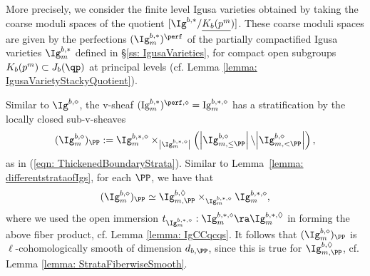 \documentclass[letterpaper,11pt]{amsart}
\begin{document}
More precisely, we consider the finite level Igusa varieties obtained by taking the coarse moduli spaces of the quotient $[\Ig^{b,\ast}/\underline{K_b(p^m})]$. These coarse moduli spaces are given by the perfections $(\Ig^{b,\ast}_{m})^{\perf}$ of the partially compactified Igusa varieties $\Ig^{b,\ast}_{m}$ defined in \S \ref{ss: IgusaVarieties}, for compact open subgroups $K_b(p^m)\subset J_b(\qp)$ at principal levels (cf. Lemma \ref{lemma: IgusaVarietyStackyQuotient}). 

Similar to $\Ig^{b,\diamond}$, the v-sheaf $(\mathrm{Ig}^{b,\ast}_m)^{\perf,\diamond}= \mathrm{Ig}^{b,\ast,\diamond}_m$ has a stratification by the locally closed sub-v-sheaves
\[(\Ig^{b,\diamond}_{m})_{\PP}:=\Ig^{b,\ast,\diamond}_{m} \times_{\left|{\Ig^{b,\ast,\diamond}_{m}}\right|}\left(\left|{\Ig^{b,\diamond}_{m,\leq\PP}}\right|\backslash{\left|{\Ig^{b,\diamond}_{m,<\PP}}\right|}\right), \]
as in (\ref{eqn: ThickenedBoundaryStrata}). Similar to Lemma~\ref{lemma: differentstrataofIgs}, for each $\PP$, we have that 
\begin{equation}{\label{eqn: finitelevelthickenedboundary}}
(\Ig^{b,\diamond}_{m})_{\PP}\simeq \Ig^{b,\Diamond}_{m,\PP}\times_{{\Ig^{b,\ast,\diamond}_{m}}}\Ig^{b,\ast,\diamond}_m, 
\end{equation}
where we used the open immersion $t_{\Ig^{b,*,\diamond}_{m}}: \Ig^{b,*,\diamond}_{m} \ra \Ig^{b,*,\Diamond}_{m}$ in forming the above fiber product, cf. Lemma \ref{lemma: IgCCqcqs}. It follows that $(\Ig^{b,\diamond}_{m})_{\PP}$ is $\ell$-cohomologically smooth of dimension $d_{b,\PP}$, since this is true for $\Ig^{b,\Diamond}_{m,\PP}$, cf. Lemma \ref{lemma: StrataFiberwiseSmooth}.
\end{document}
